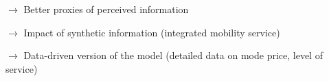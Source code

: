 {$\rightarrow$ Better proxies of perceived information \cite{gao2018trip}

\smallskip


$\rightarrow$ Impact of synthetic information (integrated mobility service) \cite{raimbault2015user}

\smallskip


$\rightarrow$ Data-driven version of the model (detailed data on mode price, level of service)

}





